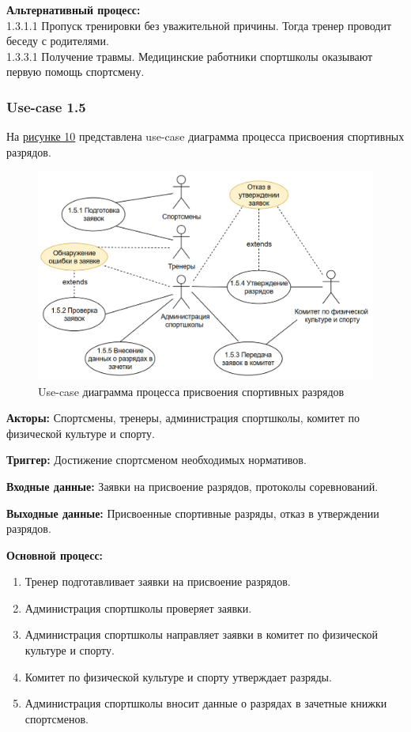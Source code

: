 \documentclass[12pt,a4paper,final]{article} %
\begin{document}
\par \textbf{Альтернативный процесс:} \\
1.3.1.1 Пропуск тренировки без уважительной причины. Тогда тренер проводит беседу с родителями. \\
1.3.3.1 Получение травмы. Медицинские работники спортшколы оказывают первую помощь спортсмену.\\

\subsubsection{Use-case 1.5}
\par На \hyperref[fig:im10]{рисунке 10} представлена use-case диаграмма процесса присвоения спортивных разрядов. 
\begin{figure}[h!]
	\centering
	\includegraphics[width=1.0\linewidth]{images/7}
	\caption{Use-case диаграмма процесса присвоения спортивных разрядов}
	\label{fig:im10}
\end{figure}	

\par \textbf{Акторы:} Спортсмены, тренеры, администрация спортшколы, комитет по физической культуре и спорту.
\par \textbf{Триггер:} Достижение спортсменом необходимых нормативов.
\par \textbf{Входные данные:} Заявки на присвоение разрядов, протоколы соревнований.
\par \textbf{Выходные данные:} Присвоенные спортивные разряды, отказ в утверждении разрядов.

\par \textbf{Основной процесс:}
\begin{enumerate}[nosep, label=1.5.\arabic*]  
	\item Тренер подготавливает заявки на присвоение разрядов.
	\item Администрация спортшколы проверяет заявки.
	\item Администрация спортшколы направляет заявки в комитет по физической культуре и спорту.
	\item Комитет по физической культуре и спорту утверждает разряды.
	\item Администрация спортшколы вносит данные о разрядах в зачетные книжки спортсменов.
\end{enumerate}
\end{document}

